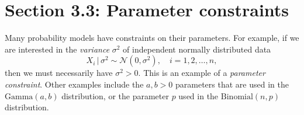  



























































































\section{Section 3.3: Parameter constraints}

Many probability models have constraints on their parameters. For example, if we are interested in the \emph{variance} $\sigma^2$ of independent normally distributed data
$$ X_i\,|\, \sigma^2 \sim \mathcal{N}(0, \sigma^2), \quad i = 1,2,\ldots,n, $$
then we must necessarily have $\sigma^2 > 0$. This is an example of a \emph{parameter constraint}. Other examples include the $a,b > 0$ parameters that are used in the $\mathrm{Gamma}(a,b)$ distribution, or the parameter $p$ used in the $\mathrm{Binomial}(n,p)$ distribution.

